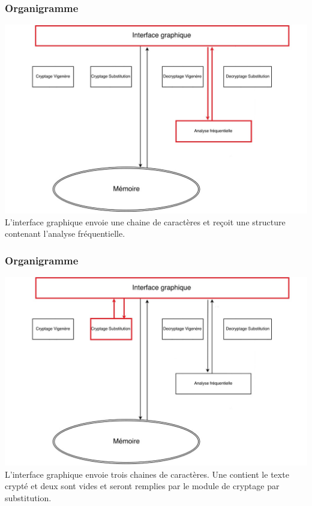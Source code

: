 \documentclass[10pt,xcolor=table]{beamer}
\begin{document}
\begin{frame}
  \frametitle{Organigramme}
\includegraphics[scale = 0.28]{Org6.jpg}\\
L'interface graphique envoie une chaine de caractères et reçoit une structure contenant l'analyse fréquentielle.
\end{frame}
\begin{frame}
  \frametitle{Organigramme}
\includegraphics[scale = 0.28]{Org7.jpg}\\
L'interface graphique envoie trois chaines de caractères. Une contient 
le texte crypté et deux sont vides et seront remplies par le module de 
cryptage par substitution.
\end{frame}
\end{document}
